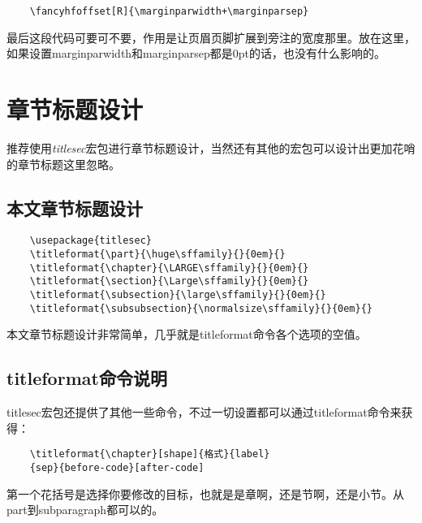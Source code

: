 \documentclass[11pt,oneside]{book}
\begin{document}
  \begin{Verbatim}
    \fancyhfoffset[R]{\marginparwidth+\marginparsep}
  \end{Verbatim}
  最后这段代码可要可不要，作用是让页眉页脚扩展到旁注的宽度那里。放在这里，如果设置marginparwidth和marginparsep都是0pt的话，也没有什么影响的。



  \chapter{章节标题设计}
  推荐使用\emph{titlesec}宏包进行章节标题设计，当然还有其他的宏包可以设计出更加花哨的章节标题这里忽略。

  \section{本文章节标题设计}
  \begin{Verbatim}
    \usepackage{titlesec}
    \titleformat{\part}{\huge\sffamily}{}{0em}{}
    \titleformat{\chapter}{\LARGE\sffamily}{}{0em}{}
    \titleformat{\section}{\Large\sffamily}{}{0em}{}
    \titleformat{\subsection}{\large\sffamily}{}{0em}{}
    \titleformat{\subsubsection}{\normalsize\sffamily}{}{0em}{}
  \end{Verbatim}
  本文章节标题设计非常简单，几乎就是titleformat命令各个选项的空值。

  \section{titleformat命令说明}
  titlesec宏包还提供了其他一些命令，不过一切设置都可以通过titleformat命令来获得：
  \begin{Verbatim}
    \titleformat{\chapter}[shape]{格式}{label}
    {sep}{before-code}[after-code]
  \end{Verbatim}
  第一个花括号是选择你要修改的目标，也就是是章啊，还是节啊，还是小节。从part到subparagraph都可以的。
\end{document}
